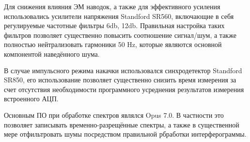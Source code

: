 \documentclass[../main.tex]{subfiles}
\begin{document}
    Для снижения влияния ЭМ наводок, а также для эффективного усиления использовались 
    усилители напряжения Standford SR560, включающие в себя регулируемые частотные фильтры 6db, 12db. 
    Правильная настройка таких фильтров позволяет существенно повысить соотношение сигнал/шум, 
    а также полностью нейтрализовать гармоники 50 Hz, которые являются основной компонентой наведённого шума.

    В случае импульсного режима накачки использовался синхродетектор Standford SR850, его использование
    позволяет существенно снизить время измерения за счет отсутствия необходимости программного усреднения 
    результатов измерения встроенного АЦП.

    Основным ПО при обработке спектров являлся Opus 7.0. В частности это позволяет записывать временно-разрещённые спектры,
    а также в существенной мере отфильтровать шумы посредством правильной рбработки интерферограммы.
\end{document}
